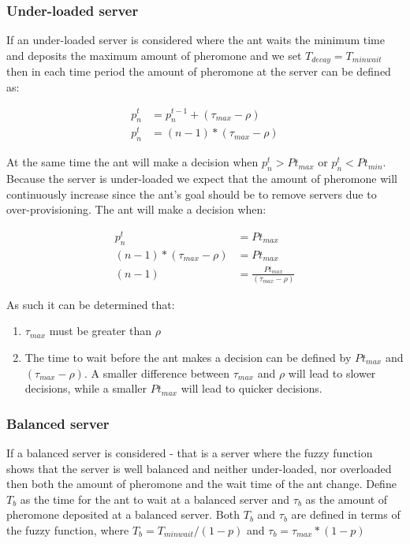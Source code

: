 \subsubsection{Under-loaded server}

If an under-loaded server is considered where the ant waits the minimum time and deposits the maximum amount of pheromone and we set $T_{decay} = T_{minwait}$ then in each time period the amount of pheromone at the server can be defined as:

\begin{equation}
\begin{aligned}
p^{t}_{n} &= p^{t-1}_{n} + (\tau_{max} - \rho) \\
p^{t}_{n} &= (n - 1) * (\tau_{max} - \rho)
\end{aligned}
\end{equation}

At the same time the ant will make a decision when $p^{t}_{n} > Pt_{max}$ or $p^{t}_{n} < Pt_{min}$. Because the server is under-loaded we expect that the amount of pheromone will continuously increase since the ant's goal should be to remove servers due to over-provisioning. The ant will make a decision when:

\begin{equation}
\begin{aligned}
p^{t}_{n} &= Pt_{max} \\
(n - 1) * (\tau_{max} - \rho) &= Pt_{max} \\
(n - 1) &= \frac{Pt_{max}}{(\tau_{max} - \rho)} 
\end{aligned}
\end{equation}

As such it can be determined that:

\begin{enumerate}
	\item $\tau_{max}$ must be greater than $\rho$
	\item The time to wait before the ant makes a decision can be defined by $Pt_{max}$ and $(\tau_{max} - \rho)$. A smaller difference between $\tau_{max}$ and $\rho$ will lead to slower decisions, while a smaller $Pt_{max}$ will lead to quicker decisions.
\end{enumerate}

\subsubsection{Balanced server}

If a balanced server is considered - that is a server where the fuzzy function shows that the server is well balanced and neither under-loaded, nor overloaded then both the amount of pheromone and the wait time of the ant change. Define $T_{b}$ as the time for the ant to wait at a balanced server and $\tau_{b}$ as the amount of pheromone deposited at a balanced server. Both $T_{b}$ and $\tau_{b}$ are defined in terms of the fuzzy function, where $T_{b} = T_{minwait} / (1 - p)$ and $\tau_{b} = \tau_{max} * (1 - p)$

